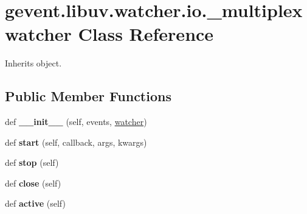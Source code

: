 \hypertarget{classgevent_1_1libuv_1_1watcher_1_1io_1_1__multiplexwatcher}{}\section{gevent.\+libuv.\+watcher.\+io.\+\_\+multiplexwatcher Class Reference}
\label{classgevent_1_1libuv_1_1watcher_1_1io_1_1__multiplexwatcher}


Inherits object.

\subsection*{Public Member Functions}
\begin{DoxyCompactItemize}
\item 
\mbox{\label{classgevent_1_1libuv_1_1watcher_1_1io_1_1__multiplexwatcher_a7036004c4bd4e7f163bef094a2ff9224}} 
def {\bfseries \+\_\+\+\_\+init\+\_\+\+\_\+} (self, events, \hyperlink{classgevent_1_1libuv_1_1watcher_1_1watcher}{watcher})
\item 
\mbox{\label{classgevent_1_1libuv_1_1watcher_1_1io_1_1__multiplexwatcher_ab3f964b00292adfefecb2100b8a0500e}} 
def {\bfseries start} (self, callback, args, kwargs)
\item 
\mbox{\label{classgevent_1_1libuv_1_1watcher_1_1io_1_1__multiplexwatcher_a79a2e2440f3194ee7dc60fed04d4e9d5}} 
def {\bfseries stop} (self)
\item 
\mbox{\label{classgevent_1_1libuv_1_1watcher_1_1io_1_1__multiplexwatcher_aa3c32f94938afe679f3bfc142bb6fb5e}} 
def {\bfseries close} (self)
\item 
\mbox{\label{classgevent_1_1libuv_1_1watcher_1_1io_1_1__multiplexwatcher_ae5026171c82f0bfe84789397e31b9815}} 
def {\bfseries active} (self)
\end{DoxyCompactItemize}
